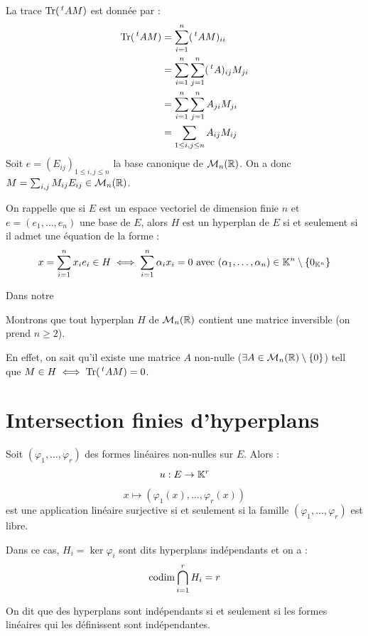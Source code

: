 \documentclass[11pt,a4paper]{report}
\begin{document}
\begin{correction}
    La trace $\mathrm{Tr}(\,^tAM)$ est donnée par :
    \begin{align*}
        \mathrm{Tr}(\,^tAM) &= \sum_{i=1}^n (\,^tAM)_{ii} \\
        &= \sum_{i=1}^n \sum_{j=1}^n (\,^tA)_{ij} M_{ji} \\
        &= \sum_{i=1}^n \sum_{j=1}^n A_{ji} M_{ji} \\
        &= \sum_{1 \le i,j \le n} A_{ij} M_{ij}
    \end{align*}
    Soit $e = (E_{ij})_{1 \le i,j \le n}$ la base canonique de $\mathcal M_n(\mathbb{R})$. On a donc $M = \sum_{i,j} M_{ij} E_{ij} \in \mathcal M_n(\mathbb{R})$.

    On rappelle que si $E$ est un espace vectoriel de dimension finie $n$ et $e = (e_1,\dots,e_n)$ une base de $E$, alors $H$ est un hyperplan de $E$ si et seulement si il admet une équation de la forme :
    $$x = \sum_{i=1}^n x_i e_i \in H \iff \sum_{i=1}^n \alpha_i x_i = 0 \text{ avec } (\alpha_1,\dots,\alpha_n) \in \mathbb{K}^n \setminus \{0_{\mathbb{K}^n}\}$$

    Dans notre
\end{correction}
\todo

\begin{application}
    Montrons que tout hyperplan $H$ de $\mathcal M_n(\mathbb{R})$ contient une matrice inversible (on prend $n \ge 2$).

    En effet, on sait qu'il existe une matrice $A$ non-nulle ($\exists A \in \mathcal M_n(\mathbb{R}) \setminus \{0\}$) tell que $M \in H \iff \mathrm{Tr}(\,^tAM) = 0$.
\end{application}
\todo

\chapter{Intersection finies d'hyperplans}

\begin{proposition}
    \label{proposition:hyperplans_independants}
    Soit $(\varphi_1,\dots,\varphi_r)$ des formes linéaires non-nulles sur $E$. Alors :
    $$u : E \to \mathbb{K}^r$$
    $$x \mapsto (\varphi_1(x),\dots,\varphi_r(x))$$
    est une application linéaire surjective si et seulement si la famille $(\varphi_1,\dots,\varphi_r)$ est libre.

    Dans ce cas, $H_i = \ker\varphi_i$ sont dits hyperplans indépendants et on a :
    $$\mathrm{codim} \bigcap_{i=1}^r H_i = r$$

    On dit que des hyperplans sont indépendants si et seulement si les formes linéaires qui les définissent sont indépendantes.
\end{proposition}
\end{document}
